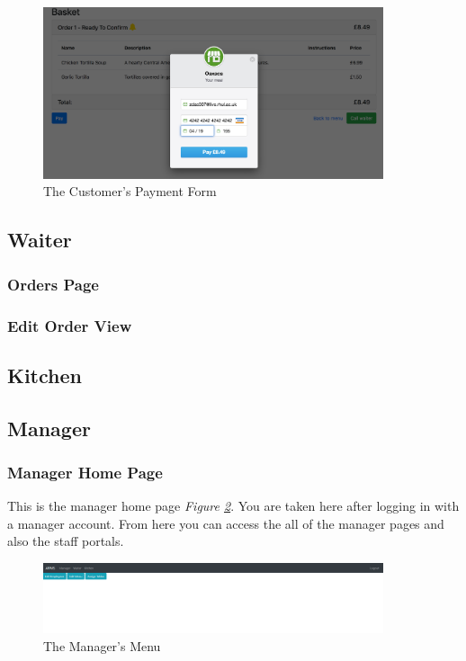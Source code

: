\documentclass[12pt, twoside, a4paper]{report}
\begin{document}
\begin{figure}[H]
  \centering
  \includegraphics[width=10cm]{Payment.png}
  \caption{The Customer's Payment Form}
  \label{fig:pay}
\end{figure}

\subsection*{Waiter}
\subsubsection*{Orders Page}

\subsubsection*{Edit Order View}

\subsection*{Kitchen}

\subsection*{Manager}
\subsubsection*{Manager Home Page}
This is the manager home page \textit{Figure \ref{fig:manMenu}}. You are taken here after logging in with a manager account. From here you can access the all of the manager pages and also the staff portals.

\begin{figure}[H]
  \centering
  \includegraphics[width=10cm]{ManagerMenu.png}
  \caption{The Manager's Menu}
  \label{fig:manMenu}
\end{figure}
\end{document}
